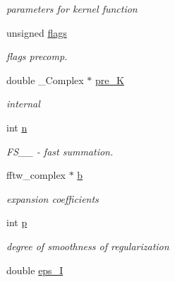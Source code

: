 \begin{CompactItemize}
\begin{CompactList}\small\item\em parameters for kernel function \item\end{CompactList}\item 
unsigned \hyperlink{structfastsum__plan_3d264dc33ae01a71908311ac9b7eadc2}{flags}
\begin{CompactList}\small\item\em flags precomp. \item\end{CompactList}\item 
double \_\-Complex $\ast$ \hyperlink{structfastsum__plan_8dbf6da034fa65b1c2c2d35883a59367}{pre\_\-K}
\begin{CompactList}\small\item\em internal \item\end{CompactList}\item 
int \hyperlink{structfastsum__plan_5615cf980018c32de59c9aba950bdfb2}{n}
\begin{CompactList}\small\item\em FS\_\-\_\- - fast summation. \item\end{CompactList}\item 
\hypertarget{structfastsum__plan_f8e5c612c9a1bb2a1a8ad30d37fba10c}{
fftw\_\-complex $\ast$ \hyperlink{structfastsum__plan_f8e5c612c9a1bb2a1a8ad30d37fba10c}{b}}
\label{structfastsum__plan_f8e5c612c9a1bb2a1a8ad30d37fba10c}

\begin{CompactList}\small\item\em expansion coefficients \item\end{CompactList}\item 
\hypertarget{structfastsum__plan_50bdfe4efb1b7df3556347cc7cffe945}{
int \hyperlink{structfastsum__plan_50bdfe4efb1b7df3556347cc7cffe945}{p}}
\label{structfastsum__plan_50bdfe4efb1b7df3556347cc7cffe945}

\begin{CompactList}\small\item\em degree of smoothness of regularization \item\end{CompactList}\item 
\hypertarget{structfastsum__plan_02e7e2f5e7b0f5713331bd129aad8192}{
double \hyperlink{structfastsum__plan_02e7e2f5e7b0f5713331bd129aad8192}{eps\_\-I}}
\label{structfastsum__plan_02e7e2f5e7b0f5713331bd129aad8192}


\end{CompactItemize}
